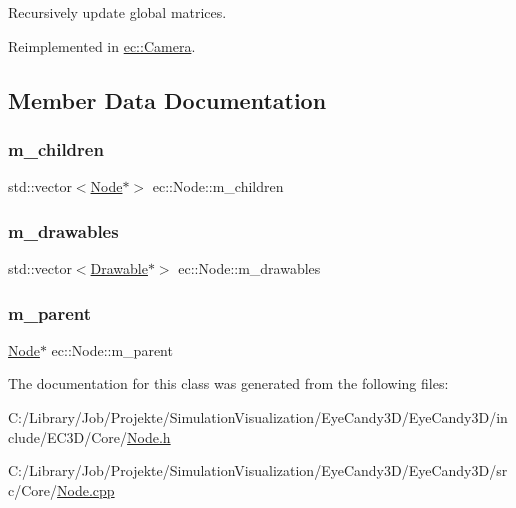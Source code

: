 Recursively update global matrices. 



Reimplemented in \mbox{\hyperlink{classec_1_1_camera_a1661dae4666cf50e697603904c96df6a}{ec\+::\+Camera}}.



\subsection{Member Data Documentation}
\mbox{\label{classec_1_1_node_a648e1758013c7fc5899cbff2f8fe41fa}} 
\subsubsection{\texorpdfstring{m\+\_\+children}{m\_children}}
{\footnotesize\ttfamily std\+::vector$<$\mbox{\hyperlink{classec_1_1_node}{Node}}$\ast$$>$ ec\+::\+Node\+::m\+\_\+children\hspace{0.3cm}{\ttfamily [protected]}}

\mbox{\label{classec_1_1_node_aa9f624971a4906674148117ba4442c01}} 
\subsubsection{\texorpdfstring{m\+\_\+drawables}{m\_drawables}}
{\footnotesize\ttfamily std\+::vector$<$\mbox{\hyperlink{classec_1_1_drawable}{Drawable}}$\ast$$>$ ec\+::\+Node\+::m\+\_\+drawables\hspace{0.3cm}{\ttfamily [protected]}}

\mbox{\label{classec_1_1_node_a9f5373bd3ba5bfed53894223adcfe791}} 
\subsubsection{\texorpdfstring{m\+\_\+parent}{m\_parent}}
{\footnotesize\ttfamily \mbox{\hyperlink{classec_1_1_node}{Node}}$\ast$ ec\+::\+Node\+::m\+\_\+parent\hspace{0.3cm}{\ttfamily [protected]}}



The documentation for this class was generated from the following files\+:\begin{DoxyCompactItemize}
\item 
C\+:/\+Library/\+Job/\+Projekte/\+Simulation\+Visualization/\+Eye\+Candy3\+D/\+Eye\+Candy3\+D/include/\+E\+C3\+D/\+Core/\mbox{\hyperlink{_node_8h}{Node.\+h}}\item 
C\+:/\+Library/\+Job/\+Projekte/\+Simulation\+Visualization/\+Eye\+Candy3\+D/\+Eye\+Candy3\+D/src/\+Core/\mbox{\hyperlink{_node_8cpp}{Node.\+cpp}}\end{DoxyCompactItemize}
